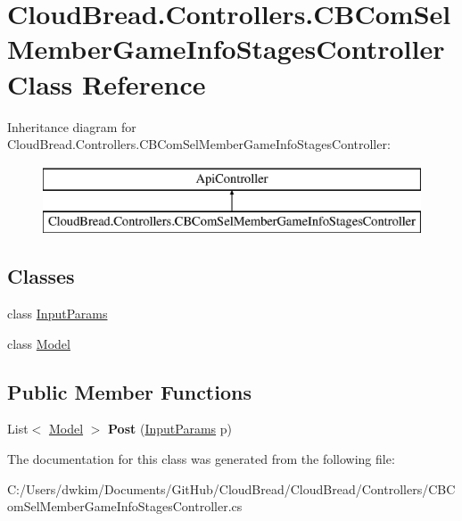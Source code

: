 \hypertarget{a00031}{}\section{Cloud\+Bread.\+Controllers.\+C\+B\+Com\+Sel\+Member\+Game\+Info\+Stages\+Controller Class Reference}
\label{a00031}
Inheritance diagram for Cloud\+Bread.\+Controllers.\+C\+B\+Com\+Sel\+Member\+Game\+Info\+Stages\+Controller\+:\begin{figure}[H]
\begin{center}
\leavevmode
\includegraphics[height=2.000000cm]{a00031}
\end{center}
\end{figure}
\subsection*{Classes}
\begin{DoxyCompactItemize}
\item 
class \hyperlink{a00117}{Input\+Params}
\item 
class \hyperlink{a00158}{Model}
\end{DoxyCompactItemize}
\subsection*{Public Member Functions}
\begin{DoxyCompactItemize}
\item 
List$<$ \hyperlink{a00158}{Model} $>$ {\bfseries Post} (\hyperlink{a00117}{Input\+Params} p)\hypertarget{a00031_a3791f972a89b1b982a73187aca6c61df}{}\label{a00031_a3791f972a89b1b982a73187aca6c61df}

\end{DoxyCompactItemize}


The documentation for this class was generated from the following file\+:\begin{DoxyCompactItemize}
\item 
C\+:/\+Users/dwkim/\+Documents/\+Git\+Hub/\+Cloud\+Bread/\+Cloud\+Bread/\+Controllers/C\+B\+Com\+Sel\+Member\+Game\+Info\+Stages\+Controller.\+cs\end{DoxyCompactItemize}
